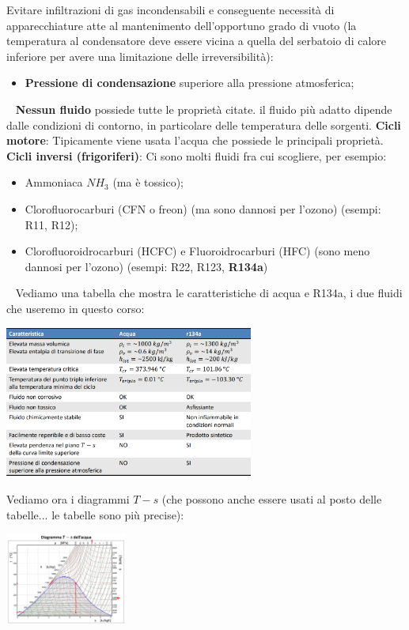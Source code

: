Evitare infiltrazioni di gas incondensabili e conseguente necessità di apparecchiature atte al mantenimento dell'opportuno grado di vuoto (la temperatura al condensatore deve essere vicina a quella del serbatoio di calore inferiore per avere una limitazione delle irreversibilità):
\begin{itemize}
    \item \textbf{Pressione di condensazione} superiore alla pressione atmosferica;
\end{itemize}
\ \newline
\textbf{Nessun fluido} possiede tutte le proprietà citate. il fluido più adatto dipende dalle condizioni di contorno, in particolare delle temperatura delle sorgenti.\newline
\newline
\textbf{Cicli motore}: Tipicamente viene usata l'acqua che possiede le principali proprietà.\newline
\newline
\textbf{Cicli inversi (frigoriferi)}: Ci sono molti fluidi fra cui scogliere, per esempio:
\begin{itemize}
    \item Ammoniaca $NH_3$ (ma è tossico);
    \item Clorofluorocarburi (CFN o freon) (ma sono dannosi per l'ozono) (esempi: R11, R12);
    \item Clorofluoroidrocarburi (HCFC) e Fluoroidrocarburi (HFC) (sono meno dannosi per l'ozono) (esempi: R22, R123, \textbf{R134a})
\end{itemize}
\ \newline
Vediamo una tabella che mostra le caratteristiche di acqua e R134a, i due fluidi che useremo in questo corso:
\begin{center}
    \includegraphics[height=5cm]{../L08/img2.PNG}
\end{center}
Vediamo ora i diagrammi $T-s$ (che possono anche essere usati al posto delle tabelle... le tabelle sono più precise):
\begin{center}
    \includegraphics[height=3cm]{../L08/img3.PNG}
\end{center}
